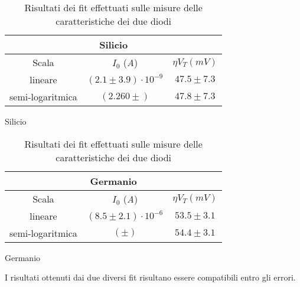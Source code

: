 \documentclass[@SRC@/main]{subfiles}
\begin{document}
    \begin{table}[h]
      \centering
      \begin{subtable}{.45\textwidth}
        \centering
        \begin{tabular}{||c|c|c||}
          \hline
          \multicolumn{3}{||c||}{Silicio} \\
          \hline
          Scala            & $I_0$ (\textit{A})         & $\eta V_T (mV)$ \\
          \hline
          lineare          & $(2.1\pm3.9)\cdot 10^{-9}$ & $47.5\pm7.3$    \\
          \hline
          semi-logaritmica & $ (2.260 \pm  )$                      & $47.8\pm 7.3$   \\
          \hline
        \end{tabular}
        \caption{Silicio}
        \label{tab:fit-silicio}
      \end{subtable}
      \hfill
      \begin{subtable}{.45\textwidth}
        \centering
        \begin{tabular}{||c|c|c||}
          \hline
          \multicolumn{3}{||c||}{Germanio} \\
          \hline
          Scala            & $I_0$ (\textit{A})           & $\eta V_T (mV)$ \\
          \hline
          lineare          & $(8.5\pm2.1) \cdot 10^{-6}$ & $53.5\pm3.1$    \\
          \hline
          semi-logaritmica & $ (\pm   )$                        & $54.4\pm3.1$   \\
          \hline
        \end{tabular}
        \caption{Germanio}
        \label{tab:fit-germanio}
      \end{subtable}
      \caption{Risultati dei fit effettuati sulle misure delle caratteristiche dei due diodi}
      \label{tab:fit-diodi}
    \end{table}

    \noindent I risultati ottenuti dai due diversi fit risultano essere compatibili entro gli errori.
\end{document}
